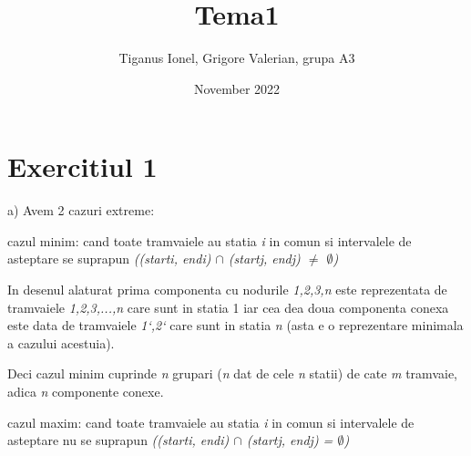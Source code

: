 \documentclass{article}
\title{Tema1}
\author{Tiganus Ionel, Grigore Valerian, grupa A3}
\date{November 2022}
\begin{document}
\maketitle
\large
\section*{Exercitiul 1}

\quad a) Avem 2 cazuri extreme:

    \quad cazul minim: cand toate tramvaiele au statia \textit{i} in comun si intervalele de asteptare se suprapun \textit{((start\small{i}\large, end\small{i}\large) $\cap$ (start\small{j}\large, end\small{j}\large) $\neq$ $\emptyset$)}
    

    
     In desenul alaturat prima componenta cu nodurile \textit{1,2,3,n} este reprezentata de tramvaiele \textit{1,2,3,...,n} care sunt in statia 1 iar cea dea doua componenta conexa este data de tramvaiele \textit{1`,2`} care sunt in statia \textit{n} (asta e o reprezentare minimala a cazului acestuia).
    
      Deci cazul minim cuprinde \textit{n} grupari (\textit{n} dat de cele \textit{n} statii) de cate \textit{m} tramvaie, adica \textit{n} componente conexe.
     
     \quad cazul maxim: cand toate tramvaiele au statia \textit{i} in comun si intervalele de asteptare nu se suprapun \textit{((start\small{i}\large, end\small{i}\large) $\cap$ (start\small{j}\large, end\small{j}\large) = $\emptyset$)}
     
    
\end{document}
